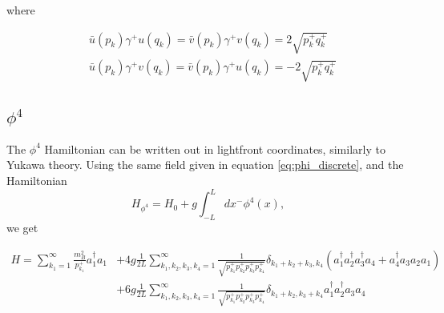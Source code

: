where 

\begin{align}
    &\bar u(p_k)\gamma^+ u(q_k) = \bar v(p_k)\gamma^+ v(q_k) = 2\sqrt{p_k^+ q_k^+}\\
    &\bar u(p_k)\gamma^+ v(q_k) = \bar v(p_k)\gamma^+ u(q_k) = -2\sqrt{p_k^+ q_k^+}
\end{align}

\subsection{$\phi^4$}
The $\phi^4$ Hamiltonian can be written out in lightfront coordinates, similarly to Yukawa theory. Using the same field given in equation \ref{eq:phi_discrete}, and the Hamiltonian 
\begin{equation}
    H_{\phi^4} = H_0 + g\int_{-L}^L dx^-\phi^4(x),
\end{equation}
we get

\begin{align}
    H
 = 
\sum_{k_1 = 1}^{\infty} \frac{m_B^2}{p_{k_1}^+} a_1^\dagger a_1
&+
4 g
\frac{1}{2L} \sum_{k_1, k_2, k_3, k_4 = 1}^{\infty}
\frac{1}{\sqrt{p_{k_1}^+ p_{k_2}^+ p_{k_3}^+ p_{k_4}^+}}
\delta_{k_1 + k_2 + k_3, k_4}
\left(
  a_1^\dagger a_2^\dagger a_3^\dagger a_4
+ a_4^\dagger a_3 a_2 a_1
\right)
\\ 
& +6 g
\frac{1}{2L} \sum_{k_1, k_2, k_3, k_4 = 1}^{\infty}
\frac{1}{\sqrt{p_{k_1}^+ p_{k_2}^+ p_{k_3}^+ p_{k_4}^+}}
\delta_{k_1 + k_2, k_3 + k_4}
a_1^\dagger a_2^\dagger a_3 a_4 \\ \nonumber
\end{align}